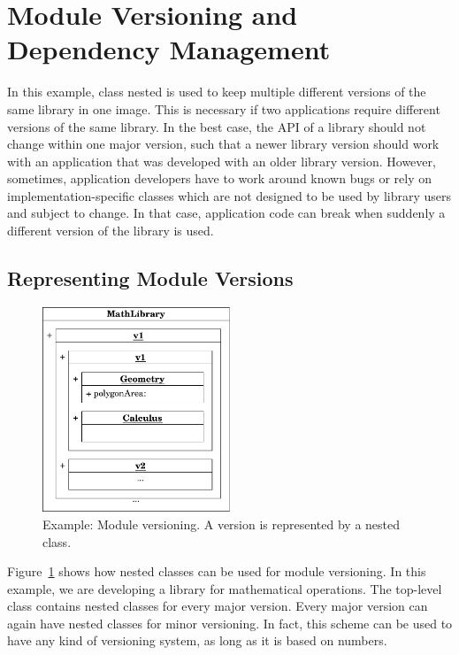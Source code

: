 \section{Module Versioning and Dependency Management}
In this example, class nested is used to keep multiple different versions of the same library in one image. This is necessary if two applications require different versions of the same library. In the best case, the API of a library should not change within one major version, such that a newer library version should work with an application that was developed with an older library version. However, sometimes, application developers have to work around known bugs or rely on implementation-specific classes which are not designed to be used by library users and subject to change. In that case, application code can break when suddenly a different version of the library is used.

\subsection{Representing Module Versions}
\begin{figure}
	\includegraphics[width=0.5\textwidth]{usecase_define_version.pdf}
	\centering
	\caption[Example: Module versioning]{Example: Module versioning. A version is represented by a nested class.}
	\label{fig:use_module_ver}
\end{figure}

Figure~\ref{fig:use_module_ver} shows how nested classes can be used for module versioning. In this example, we are developing a library for mathematical operations. The top-level class contains nested classes for every major version. Every major version can again have nested classes for minor versioning. In fact, this scheme can be used to have any kind of versioning system, as long as it is based on numbers.

